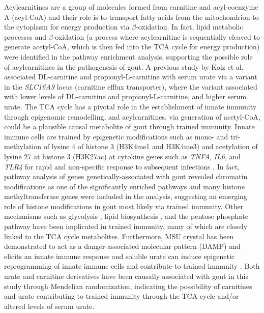 \documentclass[gucdd,article,submit,pdftex,moreauthors]{Definitions/mdpi}
\begin{document}
Acylcarnitines are a group of molecules formed from carnitine and acyl-coenzyme A (acyl-CoA) and their role is to transport fatty acids from the mitochondrion to the cytoplasm for energy production via $\beta$-oxidation.
In fact, lipid metabolic processes and $\beta$-oxidation (a process where acylcarnitine is sequentially cleaved to generate acetyl-CoA, which is then fed into the TCA cycle for energy production) were identified in the pathway enrichment analysis, supporting the possible role of acylcarnitines in the pathogenesis of gout.
A previous study by Kolz et al. \citep{kolz_meta-analysis_2009-2} associated DL-carnitine and propionyl-L-carnitine with serum urate via a variant in the \textit{SLC16A9} locus (carnitine efflux transporter), where the variant associated with lower levels of DL-carnitine and propionyl-L-carnitine, and higher serum urate.
The TCA cycle has a pivotal role in the establishment of innate immunity \citep{van_der_heijden_epigenetics_2018,arts_immunometabolic_2016,arts_glutaminolysis_2016} through epigenomic remodelling, and acylcarnitines, via generation of acetyl-CoA, could be a plausible causal metabolite of gout through trained immunity.
Innate immune cells are trained by epigenetic modifications such as mono- and tri-methylation of lysine 4 of histone 3 (H3K4me1 and H3K4me3) and acetylation of lysine 27 at histone 3 (H3K27ac) at cytokine genes such as \textit{TNFA}, \textit{IL6}, and \textit{TLR4} for rapid and non-specific response to subsequent infections \citep{saeed_epigenetic_2014,van_der_heijden_epigenetics_2018}.
In fact, pathway analysis of genes genetically-associated with gout \citep{major_genome-wide_2024} revealed chromatin modifications as one of the significantly enriched pathways and many histone methyltransferase genes were included in the analysis, suggesting an emerging role of histone modifications in gout most likely via train\-ed immunity.
Other mechanisms such as glycolysis \citep{arts_immunometabolic_2016}, lipid biosynthesis \citep{bekkering_metabolic_2018}, and the pentose phosphate pathway \citep{arts_immunometabolic_2016,arts_glutaminolysis_2016} have been implicated in trained immunity, many of which are closely linked to the TCA cycle metabolites.
Furthermore, MSU crystal has been demonstrated to act as a danger-associated molecular pattern (DAMP) and elicits an innate immune response and soluble urate can induce epigenetic reprogramming of innate immune cells and contribute to trained immunity \citep{badii_urate-induced_2021,cabau_urate-induced_2020}.
Both urate and carnitine derivatives have been causally associated with gout in this study through Mendelian randomization, indicating the possibility of carnitines and urate contributing to trained immunity through the TCA cycle and/or altered levels of serum urate.
\end{document}
